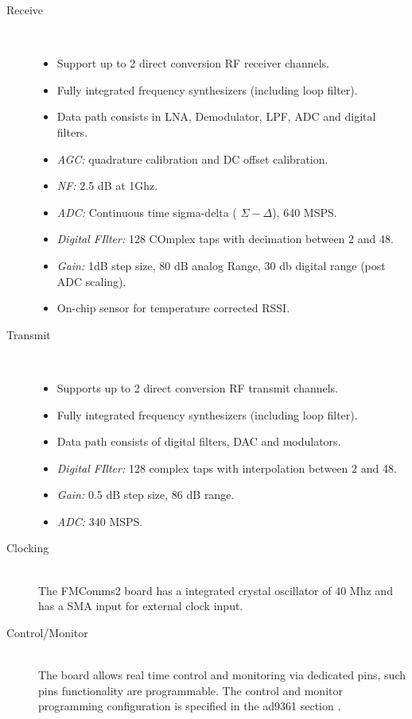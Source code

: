 \begin{description}
	\item[Receive] \hfill \\
	\begin{itemize}
		\item Support up to 2 direct conversion RF receiver channels.
		\item Fully integrated frequency synthesizers (including loop filter).
		\item Data path consists in LNA, Demodulator, LPF, ADC and digital filters.
		\item \textit{AGC:} quadrature calibration and DC offset calibration.
		\item \textit{NF:} 2.5 dB at 1Ghz.
		\item \textit{ADC:} Continuous time sigma-delta ( $\Sigma - \Delta$), 640 MSPS.
		\item \textit{Digital FIlter:} 128 COmplex taps with decimation between 2 and 48.
		\item \textit{Gain:} 1dB step size, 80 dB analog Range, 30 db digital range (post ADC scaling).
		\item On-chip sensor for temperature corrected RSSI.
	\end{itemize}

	\item[Transmit] \hfill \\
\begin{itemize}
		\item Supports up to 2 direct conversion RF transmit channels.
		\item Fully integrated frequency synthesizers (including loop filter).
\item Data path consists of digital filters, DAC and modulators.
		\item \textit{Digital FIlter:} 128 complex taps with interpolation between 2 and 48.
		\item \textit{Gain:} 0.5 dB step size, 86 dB range.
		\item \textit{ADC:} 340 MSPS.
	\end{itemize}

	\item[Clocking] \hfill \\
		The FMComms2 board has a integrated crystal oscillator of 40 Mhz and has a SMA input for external clock input.

	\item[Control/Monitor] \hfill \\
		The board allows real time control and monitoring via dedicated pins, such pins functionality are programmable. The control and monitor programming configuration is specified in the ad9361 section \cite{sec:ad9361}.

\end{description}

